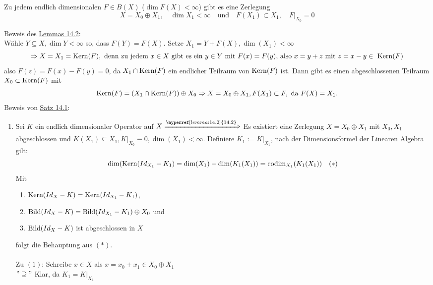 \begin{lemma} \label{lemma:14.2}
	Zu jedem endlich dimensionalen $F \in B(X)$ ($\dim F(X) < \infty$) gibt es eine Zerlegung
		\[ X = X_{0} \oplus X_{1}, \quad \dim X_{1} < \infty \quad \text{und} \quad F(X_{1}) \subset X_{1}, \quad F|_{X_{0}} = 0 \]
\end{lemma}

\begin{beweis}
	Beweis des \hyperref[lemma:14.2]{Lemmas 14.2}: \\
	Wähle $Y \subseteq X, \dim Y < \infty$ so, dass $F(Y) = F(X)$. Setze $X_{1} = Y + F(X), \dim(X_{1}) < \infty$
		\[ \Rightarrow X = X_{1} = \kernn(F), \text{ denn zu jedem } x \in X \text{ gibt es ein } y \in Y \text{ mit } F(x) = F(y) \text{, also } x = y + z \text{ mit } z = x - y \in \kernn(F) \]
		also $F(z) = F(x) - F(y) = 0$, da $X_{1} \cap \mathop{\rm Kern}\nolimits(F)$ ein endlicher Teilraum von $\mathop{\rm Kern}\nolimits(F)$ ist. Dann gibt es einen abgeschlossenen Teilraum $X_{0} \subset \mathop{\rm Kern}\nolimits(F)$ mit 
		\[ \mathop{\rm Kern}\nolimits(F) = (X_{1} \cap \mathop{\rm Kern}\nolimits(F)) \oplus X_{0} \Rightarrow X = X_{0} \oplus X_{1}, F(X_{1}) \subset F, \text{ da } F(X) = X_{1}. \]
		Beweis von \hyperref[satz:14.1]{Satz 14.1}:
		\begin{enumerate}[label=\alph*\upshape)]
			\item Sei $K$ ein endlich dimensionaler Operator auf $X \xRightarrow[]{\hyperref[lemma:14.2]{14.2}}$ Es existiert eine Zerlegung $X = X_{0} \oplus X_{1}$ mit $X_{0}, X_{1}$ abgeschlossen und $K(X_{1}) \subseteq X_{1}, K|_{X_{0}} \equiv 0, \dim(X_{1}) < \infty$. Definiere $K_{1} := K|_{X_{1}}$, nach der Dimensionsformel der Linearen Algebra gilt:
				\[ \dim( \mathop{\rm Kern}\nolimits(Id_{X_{1}} - K_{1}) = \dim(X_{1}) - \dim(K_{1}(X_{1})) = \operatorname{codim}_{X_{1}}(K_{1}(X_{1})) \quad (*) \label{eq:14.1.5-*} \]
				Mit
				\begin{enumerate}[label=(\arabic*\upshape)]
					\item $\mathop{\rm Kern}\nolimits(Id_{X} - K) = \mathop{\rm Kern}\nolimits(Id_{X_{1}} - K_{1})$,
					\item $\mathop{\rm Bild}\nolimits(Id_{X} - K) = \mathop{\rm Bild}\nolimits(Id_{X_{1}} - K_{1}) \oplus X_{0}$ und 
					\item $\mathop{\rm Bild}\nolimits(Id_{X} - K)$ ist abgeschlossen in $X$
				\end{enumerate}
				folgt die Behauptung aus \hyperref[eq:14.1.5-*]{$(*)$}. \\ \\
				Zu $(1)$: Schreibe $x \in X$ als $x = x_{0} + x_{1} \in X_{0} \oplus X_{1}$ \\
				$"\supseteq"$ Klar, da $K_{1} = K|_{X_{1}}$ \\

\end{enumerate}
\end{beweis}
